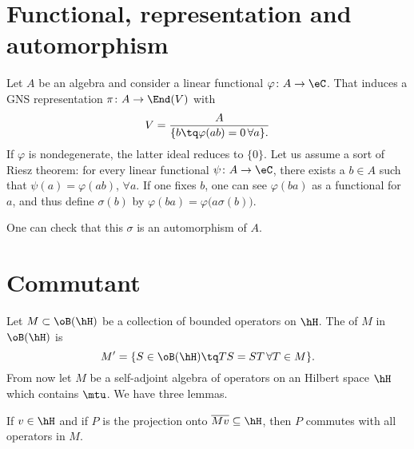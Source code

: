 
\section{Functional, representation and automorphism}

Let $A$ be an algebra and consider a linear functional $\varphi\colon A\to \eC$. That induces a GNS representation $\pi\colon A\to \End(V)$ with
\begin{equation}
	V=\frac{ A }{ \{ b\tq\varphi(ab)=0\,\forall a \}. }
\end{equation}
If $\varphi$ is nondegenerate, the latter ideal reduces to $\{ 0 \}$. Let us assume a sort of Riesz theorem: for every linear functional $\psi\colon A\to \eC$, there exists a $b\in A$ such that $\psi(a)=\varphi(ab)$, $\forall a$. If one fixes $b$, one can see $\varphi(ba)$ as a functional for $a$, and thus define $\sigma(b)$ by
$\varphi(ba)=\varphi\big(a\sigma(b)\big)$.

One can check that this $\sigma$ is an automorphism of $A$.

\section{Commutant}

Let $M\subset\oB(\hH)$ be a collection of bounded operators on $\hH$. The  of $M$ in $\oB(\hH)$ is
\begin{equation}
	M'=\{ S\in\oB(\hH)\tq TS=ST\,\forall T\in M \}.
\end{equation}
From now let $M$ be a self-adjoint algebra of operators on an Hilbert space $\hH$ which contains $\mtu$. We have three lemmas.

\begin{lemma}		\label{LemUnVN}
	If $v\in\hH$ and if $P$ is the projection onto $\overline{ Mv }\subseteq \hH$, then $P$ commutes with all operators in $M$.
\end{lemma}

